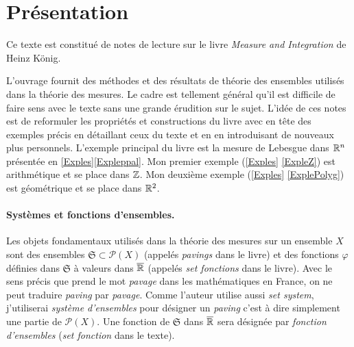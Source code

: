 


\section{Présentation}
\noindent Ce texte est constitué de notes de lecture sur le livre \emph{Measure and Integration} de Heinz König.

\noindent L'ouvrage fournit des méthodes et des résultats de théorie des ensembles utilisés dans la théorie des mesures. Le cadre est tellement général qu'il est difficile de faire sens avec le texte sans une grande érudition sur le sujet. L'idée de ces notes est de reformuler les propriétés et constructions du livre avec en tête des exemples précis en détaillant ceux du texte et en en introduisant de nouveaux plus personnels.\newline
L'exemple principal du livre est la mesure de Lebesgue dans $\mathbb{R}^n$ présentée en \ref{Exples}\ref{Expleppal}. Mon premier exemple (\ref{Exples} \ref{ExpleZ}) est arithmétique et se place dans $\mathbb{Z}$. Mon deuxième exemple (\ref{Exples} \ref{ExplePolyg}) est géométrique et se place dans $\mathbb{R}^2$.

\paragraph*{Systèmes et fonctions d'ensembles.}
Les objets fondamentaux utilisés dans la théorie des mesures sur un ensemble $X$ sont des ensembles $\mathfrak{S} \subset \mathcal{P}(X)$ (appelés \emph{pavings} dans le livre) et des fonctions $\varphi$ définies dans $\mathfrak{S}$ à valeurs dans $\overline{\mathbb{R}}$ (appelés \emph{set fonctions} dans le livre).\newline
Avec le sens précis que prend le mot \emph{pavage} dans les mathématiques en France, on ne peut traduire \emph{paving} par \emph{pavage}. Comme l'auteur utilise aussi \emph{set system}, j'utiliserai \emph{système d'ensembles} pour désigner un \emph{paving} c'est à dire simplement une partie de $\mathcal{P}(X)$.\newline
Une fonction de $\mathfrak{S}$ dans $\overline{\mathbb{R}}$ sera désignée par \emph{fonction d'ensembles} (\emph{set fonction} dans le texte).\newline

